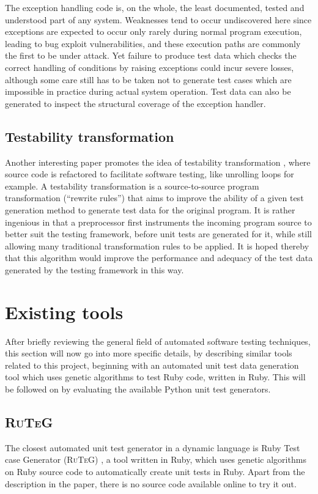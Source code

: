 \documentclass{icldt}
\numberwithin{equation}{section}       %
\begin{document}
The exception handling code is, on the whole, the least documented, tested and understood part of any system. Weaknesses tend to occur undiscovered here since exceptions are expected to occur only rarely during normal program execution, leading to bug exploit vulnerabilities, and these execution paths are commonly the first to be under attack. Yet failure to produce test data which checks the correct handling of conditions by raising exceptions could incur severe losses, although some care still has to be taken not to generate test cases which are impossible in practice during actual system operation. Test data can also be generated to inspect the structural coverage of the exception handler.

\subsection{Testability transformation}
Another interesting paper promotes the idea of testability transformation \cite{Korel2005}, where source code is refactored to facilitate software testing, like unrolling loops for example. A testability transformation is a source-to-source program transformation (``rewrite rules'') that aims to improve the ability of a given test generation method to generate test data for the original program. It is rather ingenious in that a preprocessor first instruments the incoming program source to better suit the testing framework, before unit tests are generated for it, while still allowing many traditional transformation rules to be applied. It is hoped thereby that this algorithm would improve the performance and adequacy of the test data generated by the testing framework in this way.

\section{Existing tools}
\label{sect:current-state}
After briefly reviewing the general field of automated software testing techniques, this section will now go into more specific details, by describing similar tools related to this project, beginning with an automated unit test data generation tool which uses genetic algorithms to test Ruby code, written in Ruby. This will be followed on by evaluating the available Python unit test generators.

\subsection{\textsc{RuTeG}}
The closest automated unit test generator in a dynamic language is Ruby Test case Generator (\textsc{RuTeG}) \cite{Mairhofer2011}, a tool written in Ruby, which uses genetic algorithms on Ruby source code to automatically create unit tests in Ruby. Apart from the description in the paper, there is no source code available online to try it out.
\end{document}
